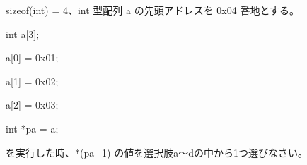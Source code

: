 sizeof(int) = 4、int 型配列 a の先頭アドレスを 0x04 番地とする。\par
\noindent int a[3]; \par
\noindent a[0] = 0x01; \par
\noindent a[1] = 0x02; \par
\noindent a[2] = 0x03; \par
\noindent int *pa = a; \par
を実行した時、*(pa+1) の値を選択肢a〜dの中から1つ選びなさい。
